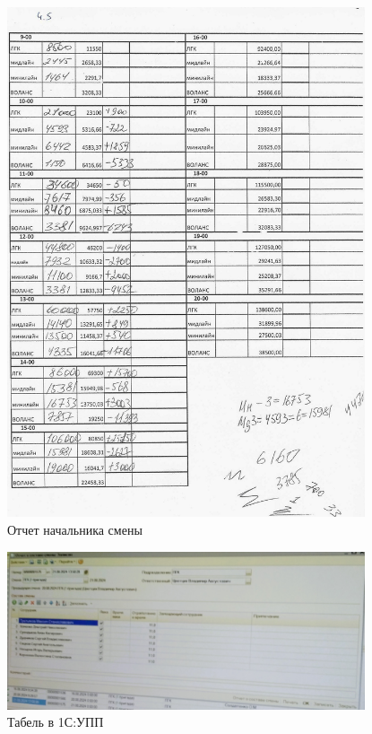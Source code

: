 \begin{figure}
\begin{center}
  \includegraphics[height=0.94\textheight, width=0.94\textwidth, keepaspectratio]{Pics 1/4.5 почасовой отчет начсмены_0001.jpg}
\end{center}
  \caption{Отчет начальника смены}
  \label{pic:4.5 почасовой отчет начсмены_0001}
\end{figure}

\begin{figure}
\begin{center}
  \includegraphics[height=0.94\textheight, width=0.94\textwidth, keepaspectratio]{Pics 1/4 табель смены в УПП.jpg}
\end{center}
  \caption{Табель в 1С:УПП}
  \label{pic:4 табель смены в УПП}
\end{figure}

